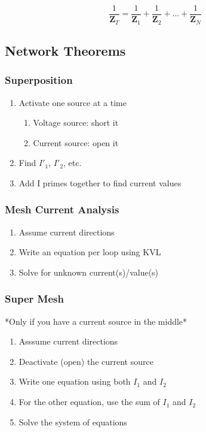 \documentclass[twocolumn, 12pt]{article}
\begin{document}
{        \begin{equation*}
            \frac{1}{\textbf{Z}_T} = \frac{1}{\textbf{Z}_1}+ \frac{1}{\textbf{Z}_2}  +...+\frac{1}{\textbf{Z}_N} 
        \end{equation*}
        
        
  

\subsection*{Network Theorems}

    \subsubsection*{Superposition}
    \begin{enumerate}
        \item Activate one source at a time
        \begin{enumerate}
            \item Voltage source: short it
            \item Current source: open it
        \end{enumerate}
        \item Find \(I'_1\), \(I'_2\), etc.
        \item Add I primes together to find current values
    \end{enumerate}
    
    \subsubsection*{Mesh Current Analysis}
    \begin{enumerate}
        \item Assume current directions
        \item Write an equation per loop using KVL
        \item Solve for unknown current(s)/value(s)
    \end{enumerate}
    
    \subsubsection*{Super Mesh}
        \begin{center}
                 *Only if you have a current source in the middle*
        \end{center}
        \begin{enumerate}
            \item Asssume current directions 
            \item Deactivate (open) the current source
            \item Write one equation using both \(I_1\) and \(I_2\)
            \item For the other equation, use the sum of \(I_1\) and \(I_2\)
            \item Solve the system of equations
        \end{enumerate}
        
}
\end{document}
